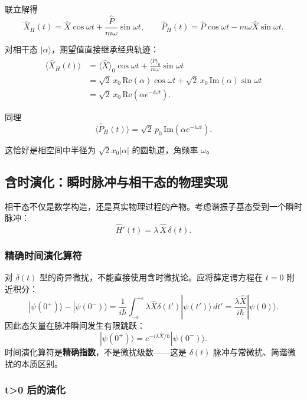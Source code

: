 联立解得
\begin{equation}
\hat{X}_H(t) = \hat{X}\cos\omega t + \frac{\hat{P}}{m\omega}\sin\omega t,
\qquad
\hat{P}_H(t) = \hat{P}\cos\omega t - m\omega\hat{X}\sin\omega t.
\end{equation}

对相干态 $|\alpha\rangle$，期望值直接继承经典轨迹：
\begin{align*}
\langle\hat{X}_H(t)\rangle
&= \langle\hat{X}\rangle_0\cos\omega t + \frac{\langle\hat{P}\rangle_0}{m\omega}\sin\omega t \\
&= \sqrt{2}\,x_0\,\text{Re}(\alpha)\cos\omega t + \sqrt{2}\,x_0\,\text{Im}(\alpha)\sin\omega t \\
&= \sqrt{2}\,x_0\,\text{Re}(\alpha e^{-i\omega t}).
\end{align*}

同理
\[
\langle\hat{P}_H(t)\rangle = \sqrt{2}\,p_0\,\text{Im}(\alpha e^{-i\omega t}).
\]

这恰好是相空间中半径为 $\sqrt{2}x_0|\alpha|$ 的圆轨道，角频率 $\omega$。

\subsection{含时演化：瞬时脉冲与相干态的物理实现}

相干态不仅是数学构造，还是真实物理过程的产物。考虑谐振子基态受到一个瞬时脉冲：
\[
\hat{H}'(t) = \lambda\,\hat{X}\,\delta(t).
\]

\subsubsection{精确时间演化算符}

对 $\delta(t)$ 型的奇异微扰，不能直接使用含时微扰论。应将薛定谔方程在 $t=0$ 附近积分：
\[
|\psi(0^+)\rangle - |\psi(0^-)\rangle
= \frac{1}{i\hbar}\int_{-\epsilon}^{+\epsilon}\lambda\hat{X}\delta(t')|\psi(t')\rangle\,dt'
= \frac{\lambda\hat{X}}{i\hbar}|\psi(0)\rangle.
\]
因此态矢量在脉冲瞬间发生有限跳跃：
\begin{equation}
|\psi(0^+)\rangle = e^{-i\lambda\hat{X}/\hbar}|\psi(0^-)\rangle.
\end{equation}
时间演化算符是\textbf{精确指数}，不是微扰级数——这是 $\delta(t)$ 脉冲与常微扰、简谐微扰的本质区别。

\subsubsection{t>0 后的演化}

